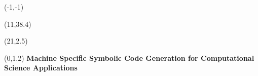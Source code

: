 \documentclass[landscape]{a0poster}
\def\Title#1{\noindent\textbf{{\Huge\color{Red} #1}}}
\begin{document}

\begin{textblock}{20}(-1,-1) 
\end{textblock} 

\begin{textblock}{20}(11,38.4) 
\end{textblock} 

\begin{textblock}{2}(21,2.5) %
\end{textblock} %








\begin{textblock}{25}(0,1.2) %
	\Title{Machine Specific Symbolic Code Generation for Computational Science Applications}
\end{textblock} %
\end{document}
